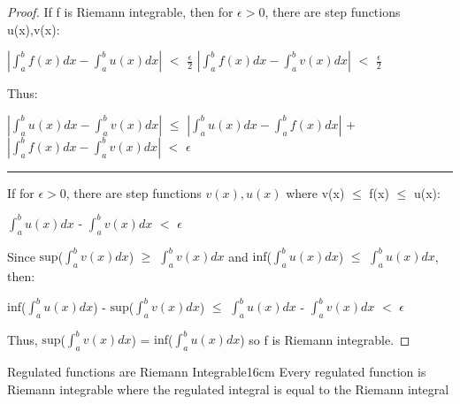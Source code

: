     \begin{proof}
        If f is Riemann integrable, then for $\epsilon > 0$,
        there are step functions u(x),v(x):

        \hspace{0.5cm}
        $|\int_a^b f(x) dx - \int_a^b u(x) dx|$ $<$ $\frac{\epsilon}{2}$
        \hspace{1cm}
        $|\int_a^b f(x) dx - \int_a^b v(x) dx|$ $<$ $\frac{\epsilon}{2}$

        Thus:

        \hspace{0.5cm}
        $|\int_a^b u(x) dx - \int_a^b v(x) dx|$
        $\leq$ $|\int_a^b u(x) dx - \int_a^b f(x) dx|$
                + $|\int_a^b f(x) dx - \int_a^b v(x) dx|$
        $<$ $\epsilon$

        \rule[0.1cm]{15.2cm}{0.01cm}

        If for $\epsilon > 0$, there are step functions $v(x),u(x)$
        where v(x) $\leq$ f(x) $\leq$ u(x):

        \hspace{0.5cm}
        $\int_a^b u(x) dx$ - $\int_a^b v(x) dx$ $<$ $\epsilon$

        Since
        $\text{sup}$($\int_a^b v(x) dx$)
        $\geq$ $\int_a^b v(x) dx$
        and
        $\text{inf}$($\int_a^b u(x) dx$)
        $\leq$ $\int_a^b u(x) dx$, then:

        \hspace{0.5cm}
        $\text{inf}$($\int_a^b u(x) dx$) - $\text{sup}$($\int_a^b v(x) dx$)
        $\leq$ $\int_a^b u(x) dx$ - $\int_a^b v(x) dx$ $<$ $\epsilon$

        Thus, $\text{sup}$($\int_a^b v(x) dx$)
        = $\text{inf}$($\int_a^b u(x) dx$)
        so f is Riemann integrable.
    \end{proof}

    \newpage



    \begin{wtheorem}{Regulated functions are Riemann Integrable}{16cm}
        Every regulated function is Riemann integrable where
        the regulated integral is equal to the Riemann integral
    \end{wtheorem}

